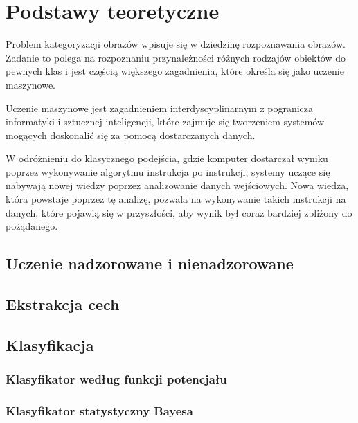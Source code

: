 \chapter{Podstawy teoretyczne}

Problem kategoryzacji obrazów wpisuje się w dziedzinę rozpoznawania obrazów. Zadanie to polega na rozpoznaniu przynależności różnych rodzajów obiektów do pewnych klas\cite{Tad91} i jest częścią większego zagadnienia, które określa się jako uczenie maszynowe.

Uczenie maszynowe jest zagadnieniem interdyscyplinarnym z pogranicza informatyki i sztucznej inteligencji, które zajmuje się tworzeniem systemów mogących doskonalić się za pomocą dostarczanych danych. 

W odróżnieniu do klasycznego podejścia, gdzie komputer dostarczał wyniku poprzez wykonywanie algorytmu instrukcja po instrukcji, systemy uczące się nabywają nowej wiedzy poprzez analizowanie danych wejściowych. Nowa wiedza, która powstaje poprzez tę analizę, pozwala na wykonywanie takich instrukcji na danych, które pojawią się w przyszłości, aby wynik był coraz bardziej zbliżony do pożądanego.



\section{Uczenie nadzorowane i nienadzorowane}


\section{Ekstrakcja cech}

\section{Klasyfikacja}

	\subsection{Klasyfikator według funkcji potencjału}
	
	\subsection{Klasyfikator statystyczny Bayesa}
	
